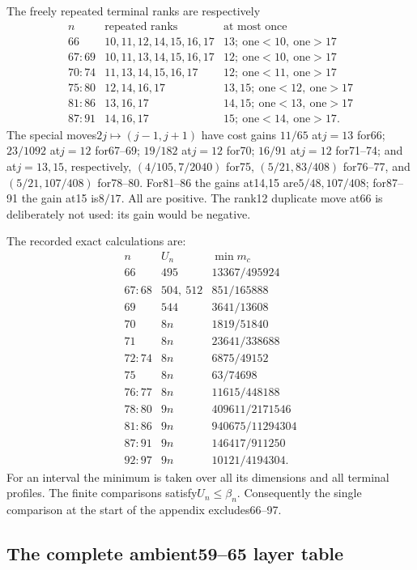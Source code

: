 \documentclass[11pt]{article}
\theoremstyle{remark}\newtheorem{remark}[theorem]{Remark}
\begin{document}
The freely repeated terminal ranks are respectively
\[
\begin{array}{c|l|l}
n&\text{repeated ranks}&\text{at most once}\\\hline
66&10,11,12,14,15,16,17&13;\ \text{one}<10,\ \text{one}>17\\
67\!:\!69&10,11,13,14,15,16,17&12;\ \text{one}<10,\ \text{one}>17\\
70\!:\!74&11,13,14,15,16,17&12;\ \text{one}<11,\ \text{one}>17\\
75\!:\!80&12,14,16,17&13,15;\ \text{one}<12,\ \text{one}>17\\
81\!:\!86&13,16,17&14,15;\ \text{one}<13,\ \text{one}>17\\
87\!:\!91&14,16,17&15;\ \text{one}<14,\ \text{one}>17 .
\end{array}
\]
The special moves$2j\mapsto(j-1,j+1)$ have cost gains
$11/65$ at$j=13$ for66; $23/1092$ at$j=12$ for67--69;
$19/182$ at$j=12$ for70; $16/91$ at$j=12$ for71--74;
and at$j=13,15$, respectively,
$(4/105,7/2040)$ for75, $(5/21,83/408)$ for76--77,
and$(5/21,107/408)$ for78--80. For81--86 the gains at14,15
are$5/48,107/408$; for87--91 the gain at15 is$8/17$.
All are positive. The rank12 duplicate move at66 is deliberately
not used: its gain would be negative.

The recorded exact calculations are:
\[
\begin{array}{c|c|c}
n&U_n&\min m_c\\\hline
66&495&13367/495924\\
67\!:\!68&504,\ 512&851/165888\\
69&544&3641/13608\\70&8n&1819/51840\\
71&8n&23641/338688\\72\!:\!74&8n&6875/49152\\
75&8n&63/74698\\76\!:\!77&8n&11615/448188\\
78\!:\!80&9n&409611/2171546\\
81\!:\!86&9n&940675/11294304\\
87\!:\!91&9n&146417/911250\\
92\!:\!97&9n&10121/4194304 .
\end{array}
\]
For an interval the minimum is taken over all its dimensions and
all terminal profiles. The finite comparisons satisfy$U_n\le\beta_n$.
Consequently the single comparison at the start of the appendix
excludes66--97.

\subsection{The complete ambient59--65 layer table}
\label{app:early-tail}
\end{document}

